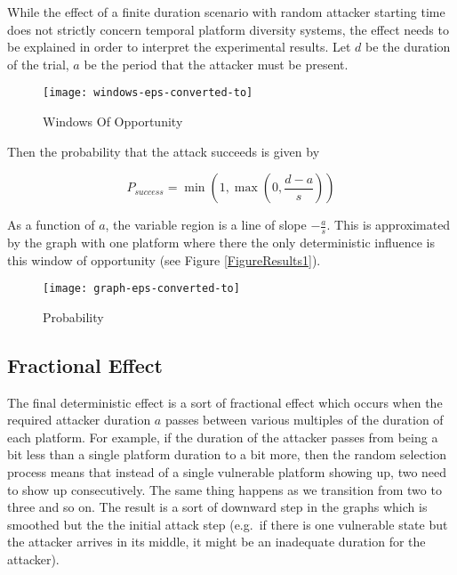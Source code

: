 \documentclass{acm_proc_article-sp}
\begin{document}
While the effect of a finite duration scenario with random attacker
starting time does not strictly concern temporal platform diversity systems, the effect
needs to be explained in order to interpret the experimental results.
Let $d$ be the duration of the trial, $a$ be the period that the
attacker must be present.

\begin{figure}[t]
\begin{centering}
\texttt{[image: windows-eps-converted-to]}
\par\end{centering}

\caption{Windows Of Opportunity}
\label{window}
\end{figure}


Then the probability that the attack succeeds is given by 

\[
P_{success}=\min\left(1,\max\left(0,\frac{d-a}{s}\right)\right)
\]


As a function of $a$, the variable region is a line of slope $-\frac{a}{s}$.
This is approximated by the graph with one platform where there the
only deterministic influence is this window of opportunity (see Figure
\ref{FigureResults1}).

\begin{figure}[t]
\begin{centering}
\texttt{[image: graph-eps-converted-to]}
\par\end{centering}

\caption{Probability}
\label{baseline}
\end{figure}

\subsection{Fractional Effect}
\label{fe}

The final deterministic effect is a sort of fractional effect which occurs when the required attacker duration $a$
passes between various multiples of the duration of each platform. For example, if the duration of the attacker passes
from being a bit less than a single platform duration to a bit more, then the random selection
process means that instead of a single vulnerable platform showing up, two need to show up consecutively. The same thing
happens as we transition from two to three and so on. The result is a sort of downward step in the graphs which is
smoothed but the the initial attack step (e.g.~if there is one vulnerable state but the attacker arrives in its middle,
it might be an inadequate duration for the attacker).
\end{document}
